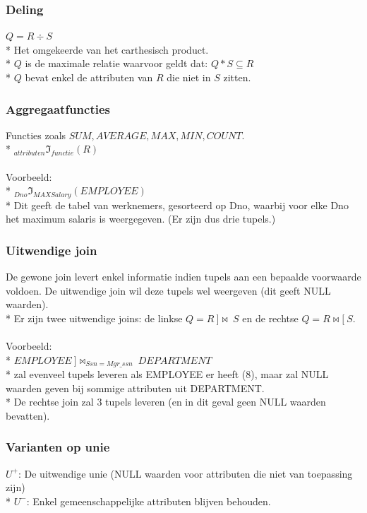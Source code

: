 \documentclass[10pt]{article}
\begin{document}
\subsubsection{Deling}
$Q = R \div S$\\*
Het omgekeerde van het carthesisch product.\\*
$Q$ is de maximale relatie waarvoor geldt dat: $Q * S \subseteq R$\\*
$Q$ bevat enkel de attributen van $R$ die niet in $S$ zitten.
\subsubsection{Aggregaatfuncties}
Functies zoals $SUM, AVERAGE, MAX, MIN, COUNT$.\\*
$_{attributen}\Im_{functie}(R)$\\\\
Voorbeeld:\\*
$_{Dno}\Im_{MAX Salary}(EMPLOYEE)$\\*
Dit geeft de tabel van werknemers, gesorteerd op Dno, waarbij voor elke Dno het maximum salaris is weergegeven. (Er zijn dus drie tupels.)
\subsubsection{Uitwendige join}
De gewone join levert enkel informatie indien tupels aan een bepaalde voorwaarde voldoen. De uitwendige join wil deze tupels wel weergeven (dit geeft NULL waarden).\\*
Er zijn twee uitwendige joins: de linkse $Q = R\ ]\bowtie\ S$ en de rechtse $Q = R \bowtie[\ S$.\\\\
Voorbeeld:\\*
$EMPLOYEE\ ]\bowtie_{Ssn = Mgr\_ssn}\ DEPARTMENT$\\*
zal evenveel tupels leveren als EMPLOYEE er heeft (8), maar zal NULL waarden geven bij sommige attributen uit DEPARTMENT.\\*
De rechtse join zal 3 tupels leveren (en in dit geval geen NULL waarden bevatten).
\subsubsection{Varianten op unie}
$U^+$: De uitwendige unie (NULL waarden voor attributen die niet van toepassing zijn)\\*
$U^-$: Enkel gemeenschappelijke attributen blijven behouden.
\end{document}
